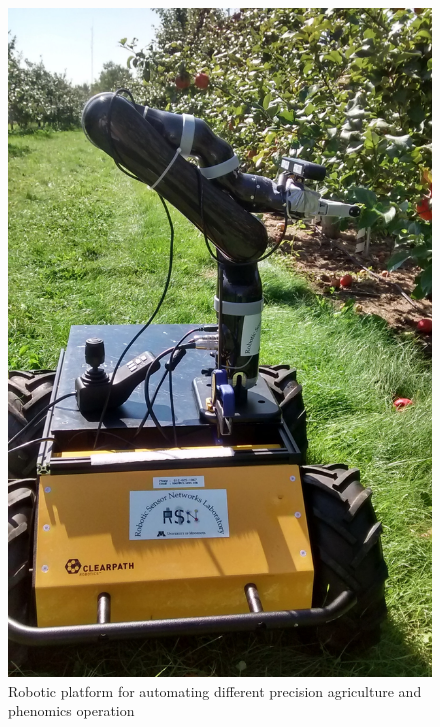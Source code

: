 \begin{figure}[htb]
\centering

    \includegraphics[scale = .1]{figures/active_counting/platform.jpg}
    \caption[Robotic platform for active perception.]{Robotic platform for automating different precision agriculture and phenomics operation}
\label{fig:robotplatform}
\end{figure}


